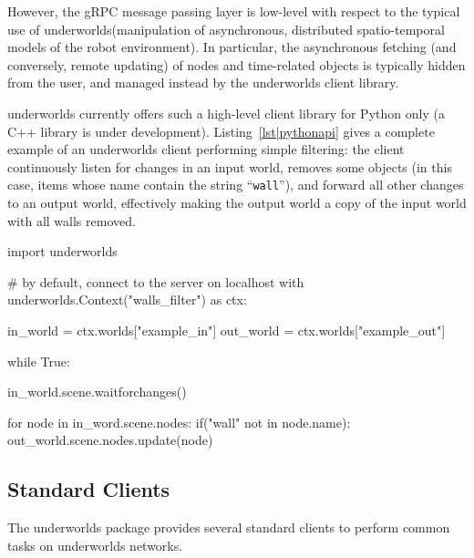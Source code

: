 \documentclass[letterpaper, 10 pt, conference]{ieeeconf}  %
\newcommand{\uwds}{{\sc underworlds}\xspace}
\begin{document}
However, the gRPC message passing layer is low-level with respect to the typical
use of \uwds (manipulation of asynchronous, distributed spatio-temporal models
of the robot environment). In particular, the asynchronous fetching (and
conversely, remote updating) of nodes and time-related objects is typically
hidden from the user, and managed instead by the \uwds client library.

\uwds currently offers such a high-level client library for Python only (a C++
library is under development).  Listing~\ref{lst|pythonapi} gives a complete
example of an \uwds client performing simple filtering: the client continuously
listen for changes in an input world, removes some objects (in this case, items
whose name contain the string ``{\tt wall}''), and forward all other changes to
an output world, effectively making the output world a copy of the input world
with all walls removed.

\begin{listing}[h!]

\begin{pythoncode}
import underworlds

# by default, connect to the server on localhost
with underworlds.Context("walls_filter") as ctx:

    in_world = ctx.worlds["example_in"]
    out_world = ctx.worlds["example_out"]

    while True:

        in_world.scene.waitforchanges()

        for node in in_word.scene.nodes:
            if("wall" not in node.name):
                out_world.scene.nodes.update(node)


\end{pythoncode}
    \caption{Example of a simple yet complete \uwds filter, written in Python:
    the client connects to the \uwds network, walk through the scene graph of
    world {\tt example\_in}, filter out some objects, and publishes the
    remaining objects in the world {\tt example\_out}.}

    \label{lst|pythonapi}
\end{listing}

\subsection{Standard Clients}
\label{std_clients}

The \uwds package provides several standard clients to perform common tasks on
\uwds networks.
\end{document}
